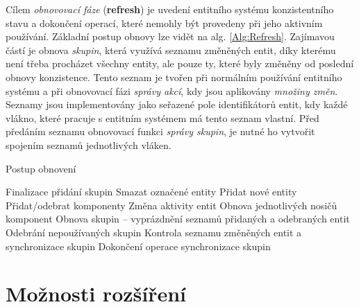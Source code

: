 Cílem \emph{obnovovací fáze} (\textbf{refresh}) je uvedení entitního systému konzistentního stavu a dokončení operací, které nemohly být provedeny při jeho aktivním používání. Základní postup obnovy lze vidět na alg. \ref{Alg:Refresh}. Zajímavou částí je obnova \emph{skupin}, která využívá seznamu změněných entit, díky kterému není třeba procházet všechny entity, ale pouze ty, které byly změněny od poslední obnovy konzistence. Tento seznam je tvořen při normálním používání entitního systému a při obnovovací fázi \emph{správy akcí}, kdy jsou aplikovány \emph{množiny změn}. Seznamy jsou implementovány jako seřazené pole identifikátorů entit, kdy každé vlákno, které pracuje s entitním systémem má tento seznam vlastní. Před předáním seznamu obnovovací funkci \emph{správy skupin}, je nutné ho vytvořit spojením seznamů jednotlivých vláken.

\begin{algorithm}
	\caption{Postup obnovení}
	\label{Alg:Refresh}
	
	\begin{algorithmic}[1]
		
			\EMBlockStart
				\State Finalizace přidání skupin
			\EMBlockEnd
			\ACBlockStart
				\State Smazat označené entity
				\State Přidat nové entity
				\State Přidat/odebrat komponenty
				\State Změna aktivity entit
			\ACBlockEnd
			\CMBlockStart
				\State Obnova jednotlivých nosičů komponent
			\CMBlockEnd
			\GMBlockStart
				\State Obnova skupin -- vyprázdnění seznamů přidaných a odebraných entit
				\State Odebrání nepoužívaných skupin
				\State Kontrola seznamu změněných entit a synchronizace skupin
				\State Dokončení operace synchronizace skupin
			\GMBlockEnd
		\EndFunction
	\end{algorithmic}
\end{algorithm}

\pagebreak
\section{Možnosti rozšíření}

